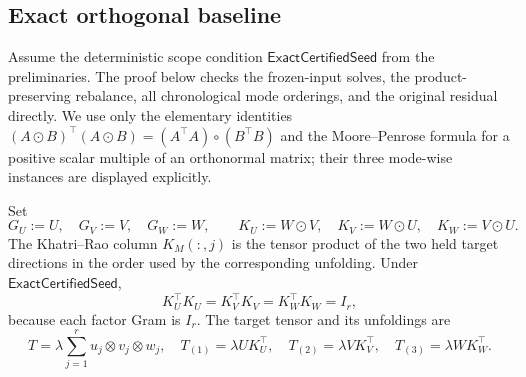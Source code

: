 \subsection{Exact orthogonal baseline}\label{app:step-013}

Assume the deterministic scope condition $\mathsf{ExactCertifiedSeed}$ from
the preliminaries.  The proof below checks the frozen-input solves, the
product-preserving rebalance, all chronological mode orderings, and the
original residual directly.  We use only the elementary identities
$(A\odot B)^\top(A\odot B)=(A^\top A)\circ(B^\top B)$ and the
Moore--Penrose formula for a positive scalar multiple of an orthonormal
matrix; their three mode-wise instances are displayed explicitly.

Set
\[
G_U:=U,\quad G_V:=V,\quad G_W:=W,\qquad
K_U:=W\odot V,\quad K_V:=W\odot U,\quad K_W:=V\odot U.
\tag{1}
\]
The Khatri--Rao column \(K_M(:,j)\) is the tensor product of the two held
target directions in the order used by the corresponding unfolding. Under
\(\mathsf{ExactCertifiedSeed}\),
\[
K_U^\top K_U=K_V^\top K_V=K_W^\top K_W=I_r,
\tag{2}
\]
because each factor Gram is \(I_r\). The target tensor and its unfoldings are
\[
T=\lambda\sum_{j=1}^r u_j\otimes v_j\otimes w_j,\quad
T_{(1)}=\lambda U K_U^\top,\quad
T_{(2)}=\lambda V K_V^\top,\quad
T_{(3)}=\lambda W K_W^\top.
\tag{3}
\]


